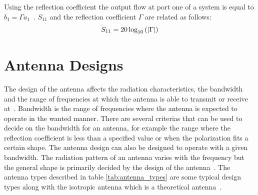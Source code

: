 Using the reflection coefficient the output flow at port one of a system is equal to $b_1=\Gamma a_1$~\cite{ming_notes}. $S_{11}$ and the reflection coefficient $\Gamma$ are related as follows:
\begin{equation}
    S_{11} = 20 \log_{10}\left(\left|\Gamma\right|\right)
    \tagaddtext{[\si{\decibel}]}
\end{equation}

\section{Antenna Designs} \label{ss:antenna_design}
The design of the antenna affects the radiation characteristics, the bandwidth and the range of frequencies at which the antenna is able to transmit or receive at~\cite[p. 76]{direct_energy}. Bandwidth is the range of frequencies where the antenna is expected to operate in the wanted manner. There are several criterias that can be used to decide on the bandwidth for an antenna, for example the range where the reflection coefficient is less than a specified value or when the polarization fits a certain shape. The antenna design can also be designed to operate with a given bandwidth. The radiation pattern of an antenna varies with the frequency but the general shape is primarily decided by the design of the antenna~\cite{bandwidth}. The antenna types described in table \ref{tab:antenna_types} are some typical design types along with the isotropic antenna which is a theoretical antenna~\cite[p. 11]{ant_beam_form}.

